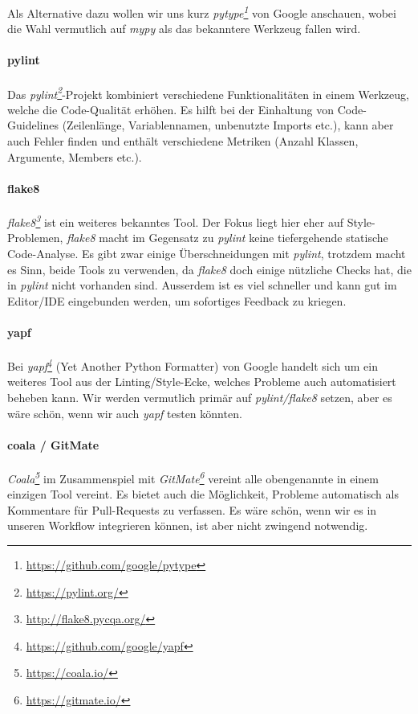 \documentclass[a4paper]{article}
\newcommand{\tool}[2]{\emph{#1\footnote{\url{#2}}}}
\begin{document}
Als Alternative dazu wollen wir uns kurz \tool{pytype}{https://github.com/google/pytype} von Google
anschauen, wobei die Wahl vermutlich auf \emph{mypy} als das bekanntere Werkzeug fallen wird.

\paragraph{pylint} Das \tool{pylint}{https://pylint.org/}-Projekt
kombiniert verschiedene Funktionalitäten in einem Werkzeug, welche die
Code-Qualität erhöhen. Es hilft bei der Einhaltung von Code-Guidelines
(Zeilenlänge, Variablennamen, unbenutzte Imports etc.), kann aber auch Fehler finden und enthält verschiedene Metriken (Anzahl Klassen, Argumente, Members etc.).

\paragraph{flake8} \tool{flake8}{http://flake8.pycqa.org/} ist
ein weiteres bekanntes Tool. Der Fokus liegt hier eher auf Style-Problemen,
\emph{flake8} macht im Gegensatz zu \emph{pylint} keine tiefergehende statische Code-Analyse.
Es gibt zwar einige Überschneidungen mit \emph{pylint}, trotzdem macht es Sinn, beide
Tools zu verwenden, da \emph{flake8} doch einige nützliche Checks hat, die in \emph{pylint}
nicht vorhanden sind. Ausserdem ist es viel schneller und kann gut im Editor/IDE eingebunden werden, um sofortiges Feedback zu kriegen.

\paragraph{yapf} Bei \tool{yapf}{https://github.com/google/yapf}
(Yet Another Python Formatter) von Google handelt sich um ein weiteres Tool aus
der Linting/Style-Ecke, welches Probleme auch automatisiert beheben kann. Wir
werden vermutlich primär auf \emph{pylint/flake8} setzen, aber es wäre schön, wenn wir
auch \emph{yapf} testen könnten.

\paragraph{coala / GitMate} \tool{Coala}{https://coala.io/} im Zusammenspiel mit \tool{GitMate}{https://gitmate.io/} vereint alle obengenannte in einem einzigen Tool vereint. Es bietet auch die Möglichkeit, Probleme automatisch als Kommentare für Pull-Requests zu verfassen. Es wäre schön, wenn wir es in unseren Workflow integrieren können, ist aber nicht zwingend notwendig.
\end{document}
